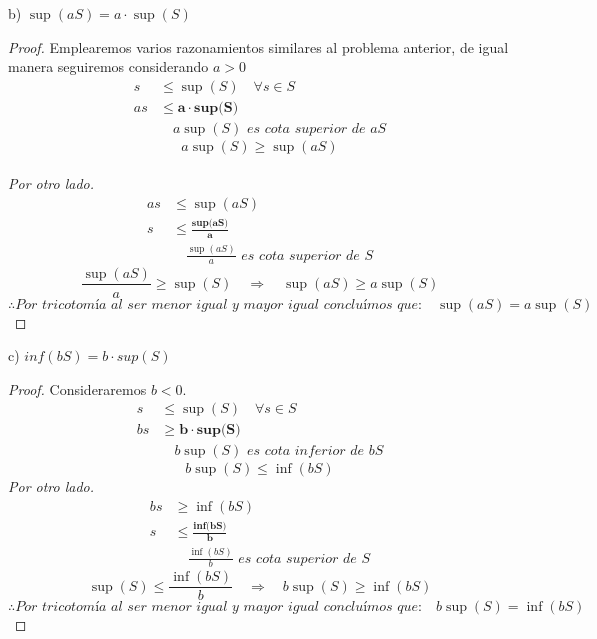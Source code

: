 \documentclass{article}
\begin{document}
  b) \(\sup(aS)=a\cdot \sup(S)\) \\
  \begin{proof}
      Emplearemos varios razonamientos similares al problema anterior, de igual manera seguiremos considerando \(a>0\) \\
      \begin{align*}
          s &\leq \sup(S) \quad \forall s \in S\\
          as &\leq \textbf{a} \cdot \textbf{sup(S)} \\
          &\quad a\sup(S) \textit{ es cota superior de aS}
      \end{align*}
      \[  a\sup(S) \geq \sup(aS)  \] \\
      \textit{Por otro lado.}
      \begin{align*}
          as &\leq \sup(aS) \\
          s &\leq \frac{\textbf{sup(aS)}}{\textbf{a}} \\
          &\quad \frac{\sup(aS)}{a} \textit{ es cota superior de S}
      \end{align*}
      \[ \frac{\sup(aS)}{a} \geq \sup(S) \quad \Rightarrow \quad \sup(aS) \geq a \sup(S) \]
      \[ \therefore \textit{Por tricotomía al ser menor igual y mayor igual concluímos que:} \quad \sup(aS) = a \sup(S) \]
  \end{proof}
\newpage

  
  c) \(inf(bS)=b\cdot sup(S)\) \\
\begin{proof}
    Consideraremos \(b<0\).\\
    \begin{align*}
        s &\leq \sup(S) \quad \forall s \in S\\
        bs &\geq \textbf{b} \cdot \textbf{sup(S)} \\
        &\quad b\sup(S) \textit{ es cota inferior de bS}
    \end{align*}
    \[ b\sup(S) \leq \inf(bS) \]
    \textit{Por otro lado.}\\
    \begin{align*}
        bs &\geq \inf(bS) \\
        s &\leq \frac{\textbf{inf(bS)}}{\textbf{b}} \\
        &\quad \frac{\inf(bS)}{b} \textit{ es cota superior de S}
    \end{align*}
    \[ \sup(S) \leq \frac{\inf(bS)}{b} \quad \Rightarrow \quad b\sup(S) \geq \inf(bS) \]
    \[ \therefore \textit{Por tricotomía al ser menor igual y mayor igual concluímos que:} \quad b\sup(S) = \inf(bS) \]
\end{proof}
  
\end{document}
